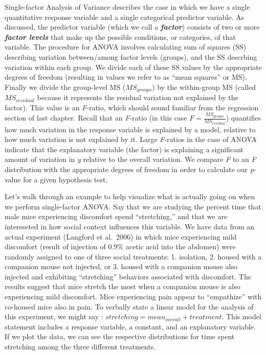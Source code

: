 \documentclass[
]{book}
\begin{document}
Single-factor Analysis of Variance describes the case in which we have a single quantitative response variable and a single categorical predictor variable. As discussed, the predictor variable (which we call a \textbf{\emph{factor}}) consists of two or more \textbf{\emph{factor levels}} that make up the possible conditions, or categories, of that variable. The procedure for ANOVA involves calculating sum of squares (SS) describing variation between/among factor levels (groups), and the SS descrbing variation within each group. We divide each of these SS values by the appropriate degrees of freedom (resulting in values we refer to as ``mean squares'' or MS). Finally we divide the group-level MS (\(MS_{groups}\)) by the within-group MS (called \(MS_{residual}\) because it represents the residual variation not explained by the factor). This value is an \emph{F}-ratio, which should sound familiar from the regression section of last chapter. Recall that an \emph{F}-ratio (in this case \(F=\frac{MS_{groups}}{MS_{residual}}\)) quantifies how much variation in the response variable is explained by a model, relative to how much variation is not explained by it. Large \emph{F}-ratios in the case of ANOVA indicate that the explanatory variable (the factor) is explaining a significant amount of variation in \emph{y} relative to the overall variation. We compare \emph{F} to an \emph{F} distribution with the appropriate degrees of freedom in order to calculate our \emph{p}-value for a given hypothesis test.

Let's walk through an example to help visualize what is actually going on when we perform single-factor ANOVA. Say that we are studying the percent time that male mice experiencing discomfort spend ``stretching,'' and that we are intereseted in how social context influences this variable. We have data from an actual experiment (Langford et al.~2006) in which mice experiencing mild discomfort (result of injection of 0.9\% acetic acid into the abdomen) were randomly assigned to one of three social treatments: 1. isolation, 2. housed with a companion mouse not injected, or 3. housed with a companion mouse also injected and exhibiting ``stretching'' behaviors associated with discomfort. The results suggest that mice stretch the most when a companion mouse is also experiencing mild discomfort. Mice experiencing pain appear to ``empathize'' with co-housed mice also in pain. To verbally state a linear model for the analysis of this experiment, we might say : \(stretching=mean_{overall}+treatment\). This model statement includes a response variable, a constant, and an explanatory variable. If we plot the data, we can see the respective distributions for time spent stretching among the three different treatments.
\end{document}
